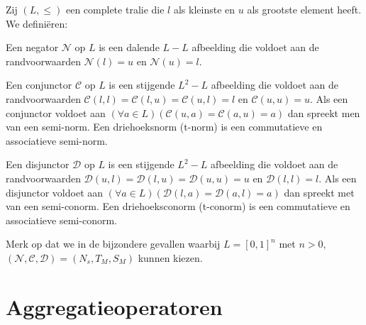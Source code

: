 Zij $(L,\le)$ een complete tralie die $l$ als kleinste en $u$ als grootste element heeft. We
defini\"eren:
\begin{definitie}
Een negator $\mathcal{N}$ op $L$ is een dalende $L - L$ afbeelding die voldoet
aan de randvoorwaarden $\mathcal{N}(l)=u$ en $\mathcal{N}(u)=l$. 
\end{definitie}
\begin{definitie}
Een conjunctor $\mathcal{C}$ op $L$ is een stijgende $L^2 - L$ afbeelding die voldoet aan de
randvoorwaarden $\mathcal{C}(l,l)=\mathcal{C}(l,u)=\mathcal{C}(u,l)=l$ en $\mathcal{C}(u,u)=u$. 
Als een conjunctor voldoet aan 
$(\forall a \in L)(\mathcal{C}(u,a)=\mathcal{C}(a,u)=a)$ dan spreekt men van een semi-norm.
Een driehoeksnorm (t-norm) is een commutatieve en associatieve semi-norm.
\end{definitie}
\begin{definitie}
Een disjunctor $\mathcal{D}$ op $L$ is een stijgende $L^2 - L$ afbeelding die voldoet
aan de randvoorwaarden $\mathcal{D}(u,l)=\mathcal{D}(l,u)=\mathcal{D}(u,u)=u$ en 
$\mathcal{D}(l,l)=l$. Als een disjunctor voldoet aan 
$(\forall a \in L)(\mathcal{D}(l,a)=\mathcal{D}(a,l)=a)$ dan spreekt met van een semi-conorm.
Een driehoeksconorm (t-conorm) is een commutatieve en associatieve semi-conorm.
\end{definitie}

Merk op dat we in de bijzondere gevallen waarbij $L=[0,1]^n$ met $n > 0$, 
$(\mathcal{N},\mathcal{C},\mathcal{D})=(N_s,T_M,S_M)$ kunnen kiezen.


\section{Aggregatieoperatoren} 